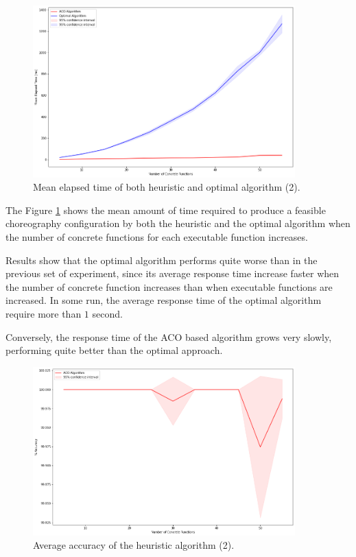 \documentclass[12pt,a4paper]{report}
\begin{document}
\begin{figure}[h]
	\centering
	\includegraphics[width=0.9\textwidth]{./Images/ACOvsOptimalIncreasingConcrete.png}
	\caption{Mean elapsed time of both heuristic and optimal algorithm (2).}%
	\label{ACOvsOptimalIncreasingConcrete}
\end{figure}

The Figure \ref{ACOvsOptimalIncreasingConcrete} shows the mean amount of time required to produce a feasible choreography configuration by both the heuristic and the optimal algorithm when the number of concrete functions for each executable function increases. 

Results show that the optimal algorithm performs quite worse than in the previous set of experiment, since its average response time increase faster when the number of concrete function increases than when executable functions are increased. In some run, the average response time of the optimal algorithm require more than $1$ second. 

Conversely, the response time of the ACO based algorithm grows very slowly, performing quite better than the optimal approach.

\begin{figure}[h]
	\centering
	\includegraphics[width=0.9\textwidth]{./Images/ACOvsOptimalAccuracyIncreasingConcrete.png}
	\caption{Average accuracy of the heuristic algorithm (2).}%
	\label{ACOvsOptimalAccuracyIncreasingConcrete}
\end{figure}
\end{document}
